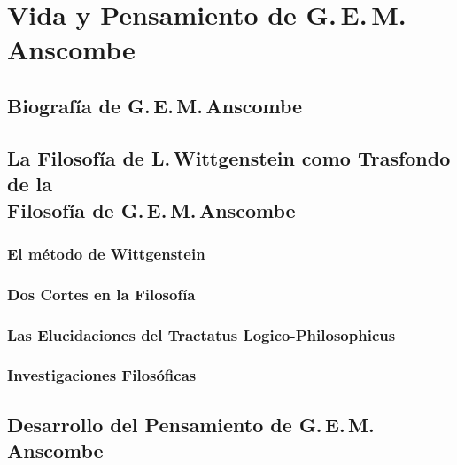 \documentclass[../main.tex]{subfiles}
\begin{document}
\setcounter{chapter}{1}




%

%

%

%

\chapter{Vida y Pensamiento de G.\,E.\,M.\,Anscombe}
\section{Biografía de G.\,E.\,M.\,Anscombe}
%
\section{La Filosofía de L.\,Wittgenstein como Trasfondo de la\\Filosofía de
    G.\,E.\,M.\,Anscombe}
% 
\subsection{El método de Wittgenstein}
\subsection{Dos Cortes en la Filosofía}
\subsection{Las Elucidaciones del Tractatus Logico-Philosophicus}
\subsection{Investigaciones Filosóficas}
\section{Desarrollo del Pensamiento de G.\,E.\,M.\,Anscombe}
%
\end{document}
